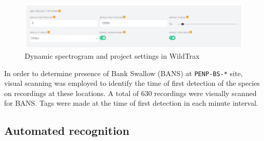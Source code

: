 \documentclass[
  letterpaper,
  DIV=11,
  numbers=noendperiod,
  oneside]{scrartcl}
\begin{document}
\begin{figure}

{\centering \includegraphics{project-dynamic.png}

}

\caption{\label{fig-project-dynamic}Dynamic spectrogram and project
settings in WildTrax}

\end{figure}

In order to determine presence of Bank Swallow (BANS) at
\texttt{PENP-BS-*} site, visual scanning was employed to identify the
time of first detection of the species on recordings at these locations.
A total of 630 recordings were visually scanned for BANS. Tags were made
at the time of first detection in each minute interval.

\hypertarget{automated-recognition}{%
\subsection{Automated recognition}\label{automated-recognition}}
\end{document}
